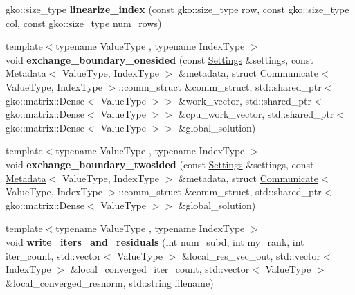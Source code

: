 \begin{DoxyCompactItemize}
\item 
\mbox{\label{namespaceschwz_a443a272fc6c66825dc7a958e824e32e3}} 
gko\+::size\+\_\+type {\bfseries linearize\+\_\+index} (const gko\+::size\+\_\+type row, const gko\+::size\+\_\+type col, const gko\+::size\+\_\+type num\+\_\+rows)
\item 
\mbox{\label{namespaceschwz_a196bb526b810b664e96fb5a54d2b2312}} 
{\footnotesize template$<$typename Value\+Type , typename Index\+Type $>$ }\\void {\bfseries exchange\+\_\+boundary\+\_\+onesided} (const \hyperlink{structschwz_1_1Settings}{Settings} \&settings, const \hyperlink{structschwz_1_1Metadata}{Metadata}$<$ Value\+Type, Index\+Type $>$ \&metadata, struct \hyperlink{classschwz_1_1Communicate}{Communicate}$<$ Value\+Type, Index\+Type $>$\+::comm\+\_\+struct \&comm\+\_\+struct, std\+::shared\+\_\+ptr$<$ gko\+::matrix\+::\+Dense$<$ Value\+Type $>$$>$ \&work\+\_\+vector, std\+::shared\+\_\+ptr$<$ gko\+::matrix\+::\+Dense$<$ Value\+Type $>$$>$ \&cpu\+\_\+work\+\_\+vector, std\+::shared\+\_\+ptr$<$ gko\+::matrix\+::\+Dense$<$ Value\+Type $>$$>$ \&global\+\_\+solution)
\item 
\mbox{\label{namespaceschwz_a23ebc9e79127b6bb0d6e30e55ce99bfa}} 
{\footnotesize template$<$typename Value\+Type , typename Index\+Type $>$ }\\void {\bfseries exchange\+\_\+boundary\+\_\+twosided} (const \hyperlink{structschwz_1_1Settings}{Settings} \&settings, const \hyperlink{structschwz_1_1Metadata}{Metadata}$<$ Value\+Type, Index\+Type $>$ \&metadata, struct \hyperlink{classschwz_1_1Communicate}{Communicate}$<$ Value\+Type, Index\+Type $>$\+::comm\+\_\+struct \&comm\+\_\+struct, std\+::shared\+\_\+ptr$<$ gko\+::matrix\+::\+Dense$<$ Value\+Type $>$$>$ \&global\+\_\+solution)
\item 
\mbox{\label{namespaceschwz_a031a20f3e3f7eb406d4c3c9165edc449}} 
{\footnotesize template$<$typename Value\+Type , typename Index\+Type $>$ }\\void {\bfseries write\+\_\+iters\+\_\+and\+\_\+residuals} (int num\+\_\+subd, int my\+\_\+rank, int iter\+\_\+count, std\+::vector$<$ Value\+Type $>$ \&local\+\_\+res\+\_\+vec\+\_\+out, std\+::vector$<$ Index\+Type $>$ \&local\+\_\+converged\+\_\+iter\+\_\+count, std\+::vector$<$ Value\+Type $>$ \&local\+\_\+converged\+\_\+resnorm, std\+::string filename)

\end{DoxyCompactItemize}
